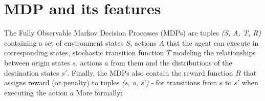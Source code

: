 




\section{MDP and its features}

The Fully Observable Markov Decision Processes (MDPs) are tuples \emph{(S, A, T, R)} containing a set of environment states $S$, actions $A$ that the agent can execute in corresponding states, stochastic transition function $T$ modeling the relationships between origin states $s$, actions $a$ from them and the distributions of the destination states $s'$. Finally, the MDPs also contain the reward function $R$ that assigns reward (or penalty) to tuples \emph{(s, a, s')} - for transitions from $s$ to $s'$ when executing the action $a$ More formally:


